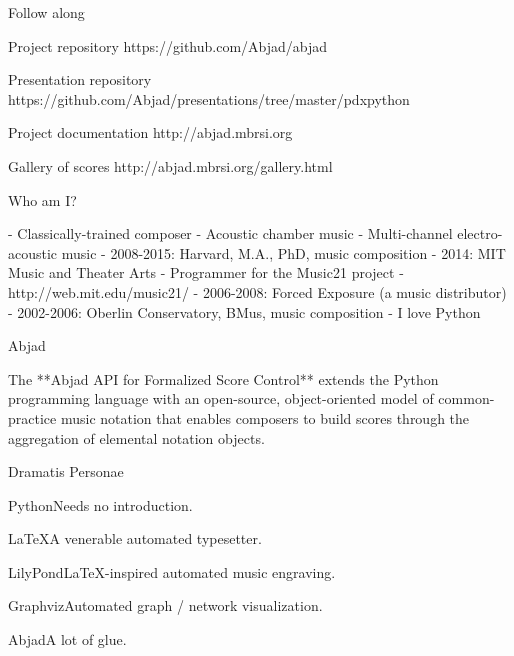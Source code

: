 \begin{frame}{Follow along}
\begin{block}{Project repository}
https://github.com/Abjad/abjad
\end{block}
\begin{block}{Presentation repository}
https://github.com/Abjad/presentations/tree/master/pdxpython
\end{block}
\begin{block}{Project documentation}
http://abjad.mbrsi.org
\end{block}
\begin{block}{Gallery of scores}
http://abjad.mbrsi.org/gallery.html
\end{block}
\end{frame}

\begin{frame}[fragile]{Who am I?}
\begin{markdown}
- Classically-trained composer
    - Acoustic chamber music
    - Multi-channel electro-acoustic music
- 2008-2015: Harvard, M.A., PhD, music composition
- 2014: MIT Music and Theater Arts
    - Programmer for the Music21 project
    - http://web.mit.edu/music21/
- 2006-2008: Forced Exposure (a music distributor)
- 2002-2006: Oberlin Conservatory, BMus, music composition
- I love Python
\end{markdown}
\end{frame}

\begin{frame}[fragile]{Abjad}
\begin{markdown}
The **Abjad API for Formalized Score Control** extends the Python
programming language with an open-source, object-oriented model of
common-practice music notation that enables composers to build scores
through the aggregation of elemental notation objects.
\end{markdown}
\end{frame}

\begin{frame}[fragile]{Dramatis Personae}
\begin{block}{Python}Needs no introduction.\end{block}
\begin{block}{LaTeX}A venerable automated typesetter.\end{block}
\begin{block}{LilyPond}LaTeX-inspired automated music engraving.\end{block}
\begin{block}{Graphviz}Automated graph / network visualization.\end{block}
\begin{block}{Abjad}A lot of glue.\end{block}
\end{frame}